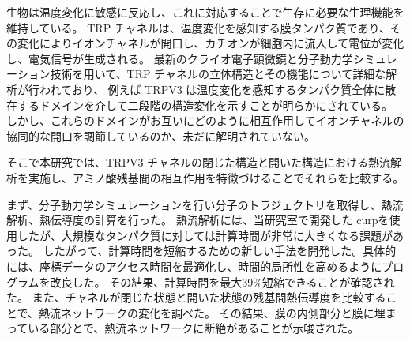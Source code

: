 生物は温度変化に敏感に反応し、これに対応することで生存に必要な生理機能を維持している。
TRP チャネルは、温度変化を感知する膜タンパク質であり、その変化によりイオンチャネルが開口し、カチオンが細胞内に流入して電位が変化し、電気信号が生成される。
最新のクライオ電子顕微鏡と分子動力学シミュレーション技術を用いて、TRP チャネルの立体構造とその機能について詳細な解析が行われており、
例えば TRPV3 は温度変化を感知するタンパク質全体に散在するドメインを介して二段階の構造変化を示すことが明らかにされている。
しかし、これらのドメインがお互いにどのように相互作用してイオンチャネルの協同的な開口を調節しているのか、未だに解明されていない。

そこで本研究では、TRPV3 チャネルの閉じた構造と開いた構造における熱流解析を実施し、アミノ酸残基間の相互作用を特徴づけることでそれらを比較する。

まず、分子動力学シミュレーションを行い分子のトラジェクトリを取得し、熱流解析、熱伝導度の計算を行った。
熱流解析には、当研究室で開発した curpを使用したが、大規模なタンパク質に対しては計算時間が非常に大きくなる課題があった。
したがって、計算時間を短縮するための新しい手法を開発した。具体的には、座標データのアクセス時間を最適化し、時間的局所性を高めるようにプログラムを改良した。
その結果、計算時間を最大39\%短縮できることが確認された。
また、チャネルが閉じた状態と開いた状態の残基間熱伝導度を比較することで、熱流ネットワークの変化を調べた。
その結果、膜の内側部分と膜に埋まっている部分とで、熱流ネットワークに断絶があることが示唆された。
